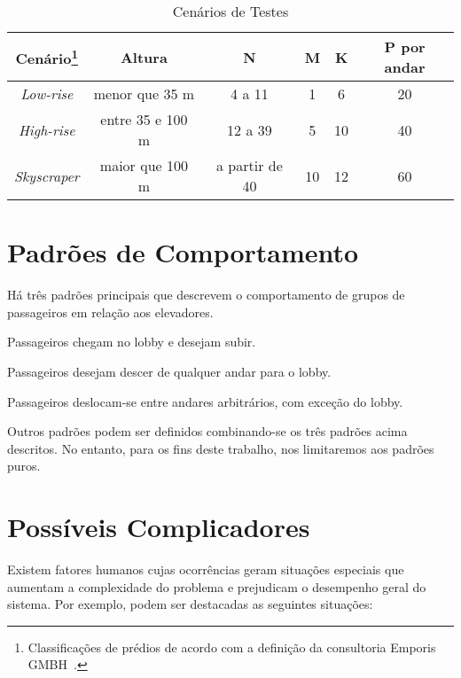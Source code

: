 \begin{savenotes}
\begin{table}[htb!]
\centering
\caption{Cenários de Testes}
\label{tab:cenarios}
\begin{tabular}{|c|c|c|c|c|c|}
\hline
{\bf Cenário\footnote{Classificações de prédios de acordo com a definição da consultoria Emporis GMBH~\cite{Emporis15}.}}    & {\bf Altura} & {\bf N}  & {\bf M}        & {\bf K} & {\bf P por andar} \\ \hline
{\it Low-rise}   & menor que 35 m          & 4 a 11         & 1       & 6       & 20      \\ \hline
{\it High-rise}  & entre 35 e 100 m        & 12 a 39        & 5       & 10      & 40      \\ \hline
{\it Skyscraper} & maior que 100 m         & a partir de 40 & 10      & 12      & 60      \\ \hline
\end{tabular}
\end{table}
\end{savenotes}

\section{Padrões de Comportamento}

Há três padrões principais que descrevem o comportamento de grupos de
passageiros em relação aos elevadores.

\begin{description}[leftmargin=!,labelwidth=\widthof{\bfseries interfloor}]
  \item[up peak]    Passageiros chegam no lobby e desejam subir.
  \item[down peak]  Passageiros desejam descer de qualquer andar para o lobby.
  \item[interfloor] Passageiros deslocam-se entre andares arbitrários, com exceção do lobby.
\end{description}

Outros padrões podem ser definidos combinando-se os três padrões acima
descritos. No entanto, para os fins deste trabalho, nos limitaremos aos padrões puros.

\section{Possíveis Complicadores}

Existem fatores humanos cujas ocorrências geram situações especiais que aumentam a complexidade do problema e prejudicam o desempenho geral do sistema. Por exemplo, podem ser destacadas as seguintes situações:

